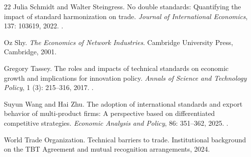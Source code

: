 \documentclass[sn-mathphys-ay]{sn-jnl}
\theoremstyle{plain}
\theoremstyle{remark}
\begin{document}
\begin{thebibliography}{22}
Julia Schmidt and Walter Steingress.
\newblock No double standards: Quantifying the impact of standard harmonization
  on trade.
\newblock \emph{Journal of International Economics}, 137: 103619,
  2022.
\newblock {}.

Oz Shy.
\newblock \emph{The Economics of Network Industries}.
\newblock Cambridge University Press, Cambridge, 2001.

Gregory Tassey.
\newblock The roles and impacts of technical standards on economic growth and
  implications for innovation policy.
\newblock \emph{Annals of Science and Technology Policy}, 1
  (3): 215--316, 2017.
\newblock {}.

Suyun Wang and Hai Zhu.
\newblock The adoption of international standards and export behavior of
  multi-product firms: A perspective based on differentiated competitive
  strategies.
\newblock \emph{Economic Analysis and Policy}, 86: 351--362, 2025.
\newblock {}.

World Trade Organization.
\newblock Technical barriers to trade.
\newblock Institutional background on the {TBT} Agreement and mutual
  recognition arrangements, 2024.

\end{thebibliography}
\end{document}
